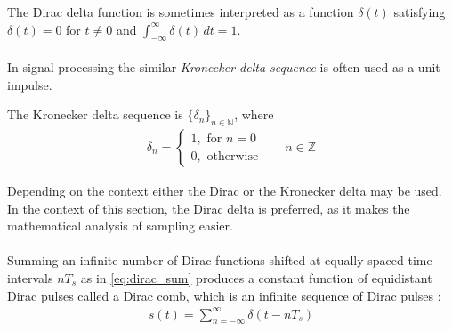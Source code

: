 The Dirac delta function is sometimes interpreted as a function $\delta(t)$ satisfying $\delta(t)=0$ for $t\neq 0$ and $\int_{-\infty}^{\infty}\!\delta(t)\,dt=1$.
\\ \\
In signal processing the similar \textit{Kronecker delta sequence} is often used as a unit impulse.
\begin{definition}\label{def:kronecker}
The Kronecker delta sequence is $\{\delta_n\}_{n\in\mathbb{N}}$, where
\begin{align}
\delta_n=
\begin{cases}1,\text{ for }n=0\\
0,\text{ otherwise}
\end{cases}\phantom{mm}n\in\mathbb{Z}
\end{align}
\end{definition}

Depending on the context either the Dirac or the Kronecker delta may be used. In the context of this section, the Dirac delta is preferred, as it makes the mathematical analysis of sampling easier.\\\\
Summing an infinite number of Dirac functions shifted at equally spaced time intervals $nT_s$ as in \eqref{eq:dirac_sum} produces a constant function of equidistant Dirac pulses called a Dirac comb, which is an infinite sequence of Dirac pulses \cite{DTSP}:
\begin{align} \label{eq:dirac_sum}
s(t)=\sum_{n=-\infty}^{\infty}\delta(t-nT_s)
\end{align}

